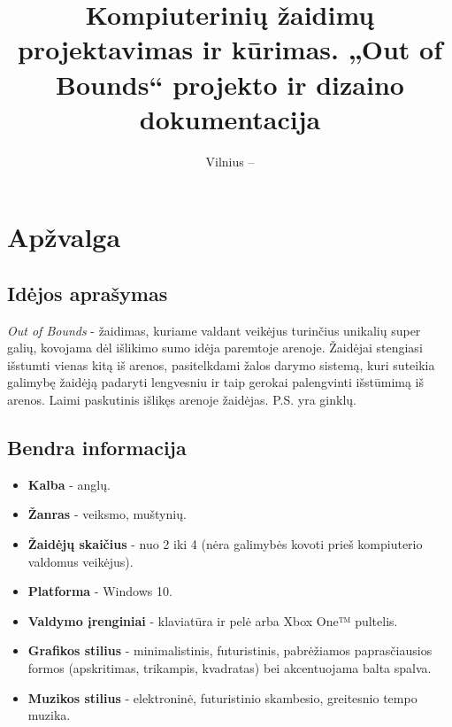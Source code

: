 \documentclass{VUMIFPSkursinis}
\title{Kompiuterinių žaidimų projektavimas ir kūrimas. „Out of Bounds“ projekto ir dizaino dokumentacija}
\date{Vilnius – \the\year}
\begin{document}
	
\maketitle

\tableofcontents



\section{Apžvalga}


\subsection{Idėjos aprašymas}
\textit{Out of Bounds} - žaidimas, kuriame valdant veikėjus turinčius unikalių super galių, kovojama dėl išlikimo sumo idėja paremtoje arenoje. Žaidėjai stengiasi išstumti vienas kitą iš arenos, pasitelkdami žalos darymo sistemą, kuri suteikia galimybę žaidėją padaryti lengvesniu ir taip gerokai palengvinti išstūmimą iš arenos. Laimi paskutinis išlikęs arenoje žaidėjas. P.S. yra ginklų.


\subsection{Bendra informacija}
\begin{itemize}
    \item \textbf{Kalba} - anglų.
    \item \textbf{Žanras} - veiksmo, muštynių.
    \item \textbf{Žaidėjų skaičius} - nuo 2 iki 4 (nėra galimybės kovoti prieš kompiuterio valdomus veikėjus).
    \item \textbf{Platforma} - Windows 10.
    \item \textbf{Valdymo įrenginiai} - klaviatūra ir pelė arba Xbox One™ pultelis.
    \item \textbf{Grafikos stilius} - minimalistinis, futuristinis, pabrėžiamos paprasčiausios formos (apskritimas, trikampis, kvadratas) bei akcentuojama balta spalva.
    \item \textbf{Muzikos stilius} - elektroninė, futuristinio skambesio, greitesnio tempo muzika.
\end{itemize}
\end{document}
